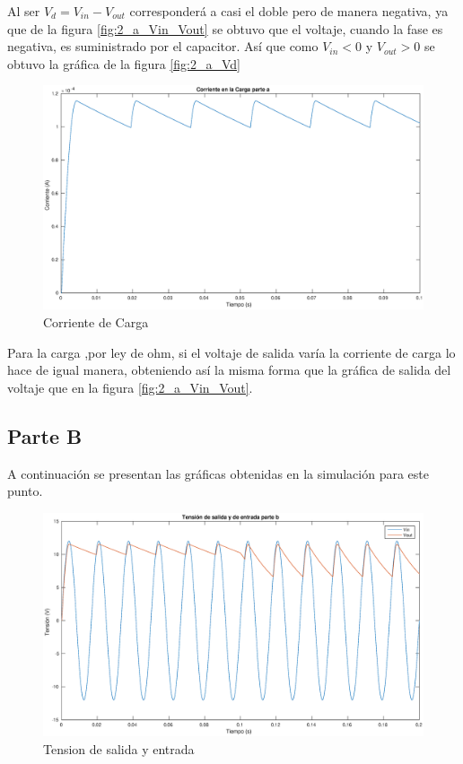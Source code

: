\documentclass[12pt,letterpaper]{article}
\begin{document}
Al ser $V_d = V_{in}-V_{out}$ corresponderá a casi el doble pero de manera negativa, ya que de la figura \ref{fig:2_a_Vin_Vout} se obtuvo que el voltaje, cuando la fase es negativa, es suministrado por el capacitor. Así que como $V_{in} < 0$ y $V_{out} > 0$ se obtuvo la gráfica de la figura \ref{fig:2_a_Vd}

\begin{figure}[ht!]
  \centering
  \includegraphics[width=0.8\linewidth]{pictures/Ejercicio2_a_carga.eps}
  \caption{Corriente de Carga}
  \label{fig:2_a_carga}
\end{figure}
Para la carga ,por ley de ohm, si el voltaje de salida varía la corriente de carga lo hace de igual manera, obteniendo así la misma forma que la gráfica de salida del voltaje que en la figura \ref{fig:2_a_Vin_Vout}. 

\subsection{Parte B}

A continuación se presentan las gráficas obtenidas en la simulación para este punto.

\begin{figure}[ht!]
  \centering
  \includegraphics[width=0.8\linewidth]{pictures/Ejercicio2_b_Vin_Vout.eps}
  \caption{Tension de salida y entrada }
  \label{fig:2_b_Vin_Vout}
\end{figure}
\end{document}
